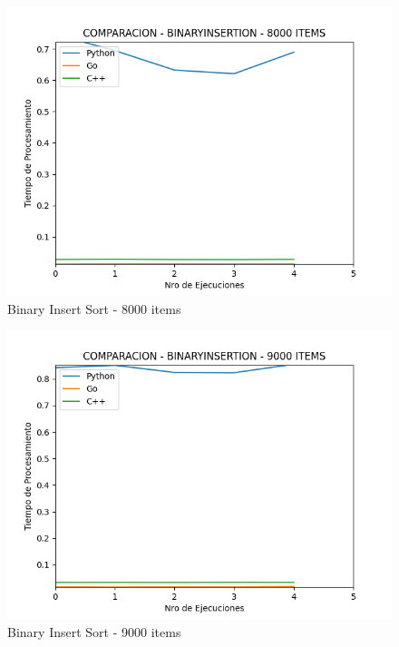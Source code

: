\documentclass[12pt]{article} %
\begin{document}
    \vspace{5mm}
    
    \begin{figure}[H]
    \centering
    \includegraphics[width=\textwidth]{binaryInsertion_8000}
    \caption{Binary Insert Sort - 8000 items}
    \end{figure}

    \vspace{5mm}
    
    \begin{figure}[H]
    \centering
    \includegraphics[width=\textwidth]{binaryInsertion_9000}
    \caption{Binary Insert Sort - 9000 items}
    \end{figure}
\end{document}
